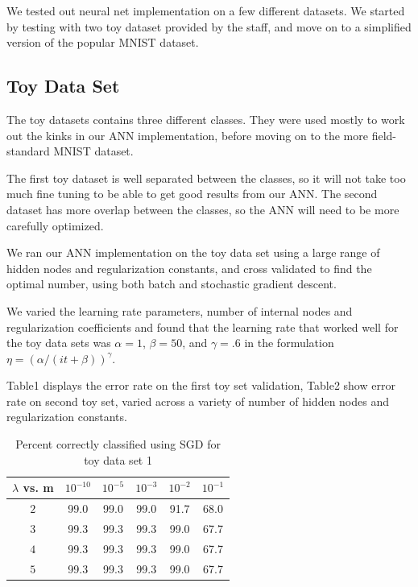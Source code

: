 \documentclass[12pt, twocolumn]{article}
\begin{document}
We tested out neural net implementation on a few different datasets. We started by testing with two toy dataset provided by the staff, and move on to a simplified version of the popular MNIST dataset.

\subsection{ Toy Data Set}

The toy datasets contains three different classes. They were used mostly to work out the kinks in our ANN implementation, before moving on to the more field-standard MNIST dataset.

The first toy dataset is well separated between the classes, so it will not take too much fine tuning to be able to get good results from our ANN. The second dataset has more overlap between the classes, so the ANN will need to be more carefully optimized.

We ran our ANN implementation on the toy data set using a large range of hidden nodes and regularization constants, and cross validated to find the optimal number, using both batch and stochastic gradient descent. 

We varied the learning rate parameters, number of internal nodes and regularization coefficients and found that the learning rate that worked well for  the toy data sets was $\alpha = 1$, $\beta = 50$, and $\gamma = .6$ in the formulation $\eta = (\alpha/(it + \beta))^\gamma$.

Table1 displays the error rate on the first toy set validation, Table2 show error rate on second toy set, varied across a variety of number of hidden nodes and regularization constants.


\begin{center}
\begin{table}
  \begin{tabular}{ | c | c | c | c | c | c | }
    \hline
     $\lambda$ vs. m & $10^{-10}$ & $10^{-5}$ & $10^{-3}$ & $10^{-2}$ & $10^{-1}$ \\ \hline
     $2$ & 99.0 & 99.0 & 99.0 & 91.7 & 68.0 \\ \hline
     $3$ & 99.3 & 99.3 & 99.3 & 99.0 & 67.7 \\ \hline
     $4$ & 99.3 & 99.3 & 99.3 & 99.0 & 67.7 \\ \hline
     $5$ & 99.3 & 99.3 & 99.3 & 99.0 & 67.7 \\
    \hline
  \end{tabular}
  \caption{ Percent correctly classified using SGD for toy data set 1}
  \end{table}
\end{center}
\end{document}
